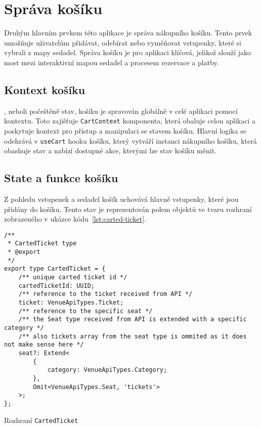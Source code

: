 \section{Správa košíku}
\label{sec:implementace-kosik}
Druhým hlavním prvkem této aplikace je správa nákupního košíku.
Tento prvek umožňuje uživatelům přidávat, odebírat nebo vyměňovat vstupenky, které si vybrali z mapy sedadel.
Správa košíku je pro aplikaci klíčová, jelikož slouží jako most mezi interaktivní mapou sedadel a procesem rezervace a platby.

\subsection{Kontext košíku}
\label{subsec:implementace-kosik-kontext}
, neboli počeštěně stav, košíku je spravován globálně v celé aplikaci pomocí kontextu.
Toto zajišťuje \texttt{CartContext} komponenta, která obaluje celou aplikaci a poskytuje kontext pro přístup a manipulaci se stavem košíku.
Hlavní logika se odehrává v \texttt{useCart} hooku košíku, který vytváří instanci nákupního košíku, která obashuje stav a nabízí dostupné akce, kterými lze stav košíku měnit.

\subsection{State a funkce košíku}
\label{subsec:implementace-kosik-state}
Z pohledu vstupenek a sedadel košík uchovává hlavně vstupenky, které jsou přidány do košíku.
Tento stav je reprezentován polem objektů ve tvaru rozhraní zobrazeného v ukázce kódu~\ref{lst:carted-ticket}.

\begin{listing}[!h]
\begin{verbatim}
/**
 * CartedTicket type
 * @export
 */
export type CartedTicket = {
	/** unique carted ticket id */
	cartedTicketId: UUID;
	/** reference to the ticket received from API */
	ticket: VenueApiTypes.Ticket;
	/** reference to the specific seat */
	/** the Seat type received from API is extended with a specific category */
	/** also tickets array from the seat type is ommited as it does not make sense here */
	seat?: Extend<
		{
			category: VenueApiTypes.Category;
		},
		Omit<VenueApiTypes.Seat, 'tickets'>
	>;
};
\end{verbatim}
\caption{Rozhraní \texttt{CartedTicket}}
\label{lst:carted-ticket}
\end{listing}

